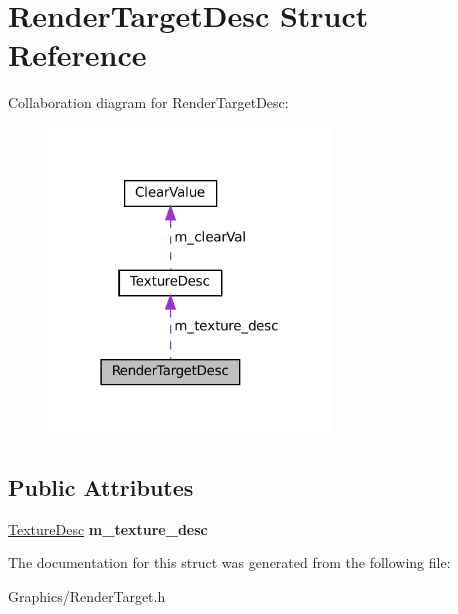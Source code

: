 \hypertarget{structRenderTargetDesc}{}\section{Render\+Target\+Desc Struct Reference}
\label{structRenderTargetDesc}


Collaboration diagram for Render\+Target\+Desc\+:\nopagebreak
\begin{figure}[H]
\begin{center}
\leavevmode
\includegraphics[width=214pt]{structRenderTargetDesc__coll__graph}
\end{center}
\end{figure}
\subsection*{Public Attributes}
\begin{DoxyCompactItemize}
\item 
\mbox{\label{structRenderTargetDesc_af4da5794f1ac1b7376f29f89d3f46c9d}} 
\hyperlink{structTextureDesc}{Texture\+Desc} {\bfseries m\+\_\+texture\+\_\+desc}
\end{DoxyCompactItemize}


The documentation for this struct was generated from the following file\+:\begin{DoxyCompactItemize}
\item 
Graphics/Render\+Target.\+h\end{DoxyCompactItemize}
